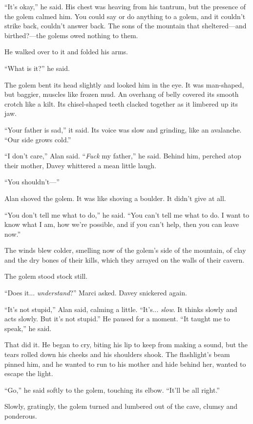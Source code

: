 ``It's okay,'' he said.  His chest was heaving from his tantrum, but
the presence of the golem calmed him.  You could say or do anything to
a golem, and it couldn't strike back, couldn't answer back.  The sons
of the mountain that sheltered---and birthed?---the golems owed
nothing to them.

He walked over to it and folded his arms.

``What is it?'' he said.

The golem bent its head slightly and looked him in the eye.  It was
man-shaped, but baggier, muscles like frozen mud.  An overhang of
belly covered its smooth crotch like a kilt.  Its chisel-shaped teeth
clacked together as it limbered up its jaw.

``Your father is sad,'' it said.  Its voice was slow and grinding,
like an avalanche.  ``Our side grows cold.''

``I don't care,'' Alan said.  ``\textit{Fuck} my father,'' he said. 
Behind him, perched atop their mother, Davey whittered a mean little
laugh.

``You shouldn't---''

Alan shoved the golem.  It was like shoving a boulder.  It didn't give
at all.

``You don't tell me what to do,'' he said.  ``You can't tell me what
to do.  I want to know what I am, how we're possible, and if you can't
help, then you can leave now.''

The winds blew colder, smelling now of the golem's side of the
mountain, of clay and the dry bones of their kills, which they arrayed
on the walls of their cavern.

The golem stood stock still.

``Does it...  \textit{understand}?'' Marci asked.  Davey snickered
again.

``It's not stupid,'' Alan said, calming a little.  ``It's... 
\textit{slow}.  It thinks slowly and acts slowly.  But it's not
stupid.'' He paused for a moment.  ``It taught me to speak,'' he said.

That did it.  He began to cry, biting his lip to keep from making a
sound, but the tears rolled down his cheeks and his shoulders shook. 
The flashlight's beam pinned him, and he wanted to run to his mother
and hide behind her, wanted to escape the light.

``Go,'' he said softly to the golem, touching its elbow.  ``It'll be
all right.''

Slowly, gratingly, the golem turned and lumbered out of the cave,
clumsy and ponderous.

